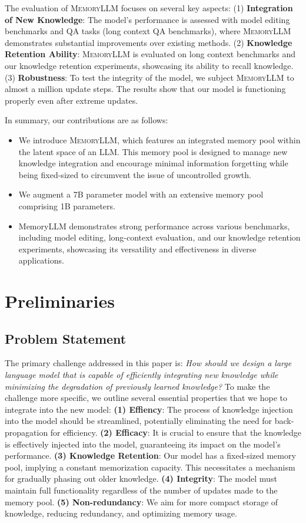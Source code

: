 \documentclass{article}
\theoremstyle{plain}
\theoremstyle{definition}
\theoremstyle{remark}
\newcommand{\ours}{\textsc{MemoryLLM}\xspace}
\begin{document}
The evaluation of \ours focuses on several key aspects: (1) \textbf{Integration of New Knowledge}: The model's performance is assessed with model editing benchmarks and QA tasks (long context QA benchmarks), where \ours demonstrates substantial improvements over existing methods. 
(2) \textbf{Knowledge Retention Ability}:
\ours is evaluated on long context benchmarks and our knowledge retention experiments, showcasing its ability to recall knowledge. 
(3) \textbf{Robustness}: To test the integrity of the model, we subject \ours to almost a million update steps. 
The results show that our model is functioning properly even after extreme updates. 

In summary, our contributions are as follows:
\begin{itemize}[nosep,leftmargin=*]
    \item We introduce \ours, which features an integrated memory pool within the latent space of an LLM. This memory pool is designed to manage new knowledge integration and encourage minimal information forgetting while being fixed-sized to circumvent the issue of uncontrolled growth.
    \item We augment a 7B parameter model with an extensive memory pool comprising 1B parameters. 
    \item MemoryLLM demonstrates strong performance across various benchmarks, including model editing, long-context evaluation, and our knowledge retention experiments, showcasing its versatility and effectiveness in diverse applications.
\end{itemize}



\section{Preliminaries}
\subsection{Problem Statement}
The primary challenge addressed in this paper is: \emph{How should we design a large language model that is capable of efficiently integrating new knowledge while minimizing the degradation of previously learned knowledge?} 
To make the challenge more specific, we outline several essential properties that we hope to integrate into the new model: \textbf{(1) Effiency}: The process of knowledge injection into the model should be streamlined, potentially eliminating the need for back-propagation for efficiency. \textbf{(2) Efficacy}: It is crucial to ensure that the knowledge is effectively injected into the model, guaranteeing its impact on the model's performance. 
\textbf{(3) Knowledge Retention}: Our model has a fixed-sized memory pool, implying a constant memorization capacity. This necessitates a mechanism for gradually phasing out older knowledge.
\textbf{(4) Integrity}: The model must maintain full functionality regardless of the number of updates made to the memory pool. 
\textbf{(5) Non-redundancy}: We aim for more compact storage of knowledge, reducing redundancy, and optimizing memory usage. 
\end{document}
